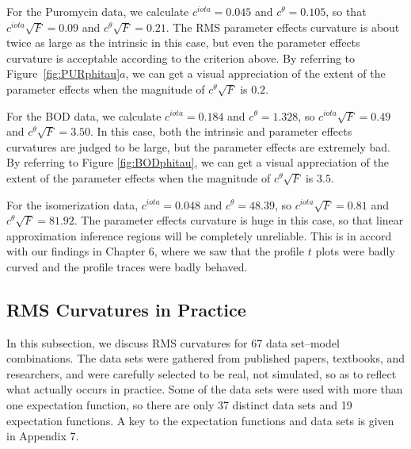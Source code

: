 \begin{example}\label{mic:16}

For the Puromycin data, we calculate
$c^{iota} = 0.045$ and $c^{\theta} = 0.105$, so that
$c^{iota} \sqrt F = 0.09$ and $c^{\theta} \sqrt F = 0.21$.
The RMS parameter effects curvature is about twice as large
as the intrinsic in this case, but even the parameter effects
curvature is acceptable according to the criterion above.
By referring to Figure~\ref{fig:PURphitau}$a$, we can get a visual
appreciation of the extent of the parameter effects when the
magnitude of $c^{\theta} \sqrt F$ is $0.2$.
\end{example}

\begin{example}\label{bod:5}

For the BOD data, we calculate
$c^{iota} = 0.184$ and $c^{\theta} = 1.328$, so
$c^{iota} \sqrt F = 0.49$ and $c^{\theta} \sqrt F = 3.50$.
In this case, both the intrinsic and parameter effects curvatures are
judged to be large, but the parameter effects are extremely bad.
By referring to Figure \ref{fig:BODphitau}, we can get a visual
appreciation of the extent of the parameter effects when the
magnitude of $c^{\theta} \sqrt F$ is $3.5$.
\end{example}

\begin{example}\label{iso:isocurv}

For the isomerization data, $c^{iota} = 0.048$ and
$c^{\theta} = 48.39$, so $c^{iota} \sqrt F = 0.81$ and
$c^{\theta} \sqrt F = 81.92$.
The parameter effects curvature is huge in this case,
so that linear approximation inference regions will be completely
unreliable.
This is in accord with our findings in Chapter 6, where we
saw that the profile $t$ plots were badly curved and the profile traces
were badly behaved.
\end{example}

\subsection{RMS Curvatures in Practice}

In this subsection, we discuss RMS curvatures for 67
data set--model combinations.
The data sets were gathered from published papers,
textbooks, and researchers, and were carefully
selected to be real, not simulated, so as to reflect what
actually occurs in practice.
Some of the data sets were used with more than one expectation
function, so there are only 37 distinct data sets and
19 expectation functions.
A key to the expectation functions and data sets is given in Appendix 7.

